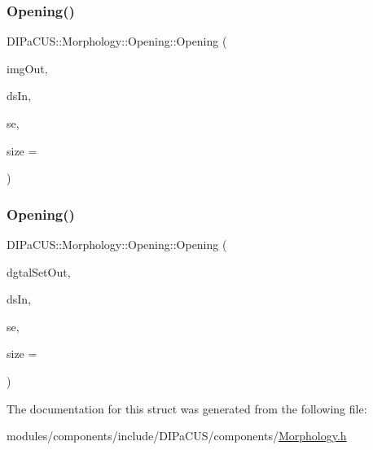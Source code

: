 \subsubsection{\texorpdfstring{Opening()}{Opening()}\hspace{0.1cm}{\footnotesize\ttfamily [1/2]}}
{\footnotesize\ttfamily D\+I\+Pa\+C\+U\+S\+::\+Morphology\+::\+Opening\+::\+Opening (\begin{DoxyParamCaption}\item[{\mbox{\hyperlink{namespaceDIPaCUS_1_1Morphology_a9aff9edf28d681accfc54435fbefcbee}{Image2D}} \&}]{img\+Out,  }\item[{const \mbox{\hyperlink{namespaceDIPaCUS_1_1Morphology_ab69fa725716b0ed4c311c0d00a292be7}{Digital\+Set}} \&}]{ds\+In,  }\item[{\mbox{\hyperlink{namespaceDIPaCUS_1_1Morphology_a60b552d68432e7992f09717070d9c4e7}{Structuring\+Element}}}]{se,  }\item[{int}]{size = {} }\end{DoxyParamCaption})}

\mbox{\label{structDIPaCUS_1_1Morphology_1_1Opening_abef71bdce6c02360740c782b11bfdfa1}} 
\subsubsection{\texorpdfstring{Opening()}{Opening()}\hspace{0.1cm}{\footnotesize\ttfamily [2/2]}}
{\footnotesize\ttfamily D\+I\+Pa\+C\+U\+S\+::\+Morphology\+::\+Opening\+::\+Opening (\begin{DoxyParamCaption}\item[{\mbox{\hyperlink{namespaceDIPaCUS_1_1Morphology_ab69fa725716b0ed4c311c0d00a292be7}{Digital\+Set}} \&}]{dgtal\+Set\+Out,  }\item[{const \mbox{\hyperlink{namespaceDIPaCUS_1_1Morphology_ab69fa725716b0ed4c311c0d00a292be7}{Digital\+Set}} \&}]{ds\+In,  }\item[{\mbox{\hyperlink{namespaceDIPaCUS_1_1Morphology_a60b552d68432e7992f09717070d9c4e7}{Structuring\+Element}}}]{se,  }\item[{int}]{size = {} }\end{DoxyParamCaption})}



The documentation for this struct was generated from the following file\+:\begin{DoxyCompactItemize}
\item 
modules/components/include/\+D\+I\+Pa\+C\+U\+S/components/\mbox{\hyperlink{Morphology_8h}{Morphology.\+h}}\end{DoxyCompactItemize}
